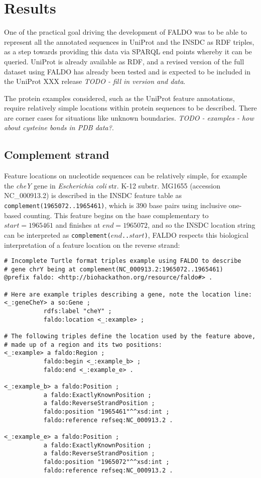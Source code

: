 \section*{Results}
One of the practical goal driving the development of FALDO was to be able
to represent all the annotated sequences in UniProt and the INSDC as RDF
triples, as a step towards providing this data via SPARQL end points whereby
it can be queried.
UniProt is already available as RDF, and a revised version of the full
dataset using FALDO has already been tested and is expected to be included
in the UniProt XXX release \textit{TODO - fill in version and data}.

The protein examples considered, such as the UniProt feature annotations,
require relatively simple locations within protein sequences to be described.
There are corner cases for situations like unknown boundaries.
\textit{TODO - examples - how about cysteine bonds in PDB data?}.

\subsection*{Complement strand}
Feature locations on nucleotide sequences can be relatively simple,
for example the \textit{cheY} gene in
\textit{Escherichia coli} str. K-12 substr. MG1655 (accession NC\_000913.2)
is described in the INSDC feature table as \texttt{complement(1965072..1965461)},
which is 390 base pairs using inclusive one-based counting.
This feature begins on the base complementary to $start = 1965461$
and finishes at $end = 1965072$, and so the INSDC location string
can be interpreted as \texttt{complement($end$..$start$)},
FALDO respects this biological interpretation of a feature location
on the reverse strand:

\begin{shaded}
\small
\begin{verbatim}
# Incomplete Turtle format triples example using FALDO to describe
# gene chrY being at complement(NC_000913.2:1965072..1965461)
@prefix faldo: <http://biohackathon.org/resource/faldo#> .

# Here are example triples describing a gene, note the location line:
<_:geneCheY> a so:Gene ;
           rdfs:label "cheY" ;
           faldo:location <_:example> ;

# The following triples define the location used by the feature above,
# made up of a region and its two positions:
<_:example> a faldo:Region ;
           faldo:begin <_:example_b> ;
           faldo:end <_:example_e> .

<_:example_b> a faldo:Position ; 
           a faldo:ExactlyKnownPosition ;
           a faldo:ReverseStrandPosition ;
           faldo:position "1965461"^^xsd:int ;
           faldo:reference refseq:NC_000913.2 .

<_:example_e> a faldo:Position ; 
           a faldo:ExactlyKnownPosition ;
           a faldo:ReverseStrandPosition ;
           faldo:position "1965072"^^xsd:int ;
           faldo:reference refseq:NC_000913.2 .
\end{verbatim}
\end{shaded}

